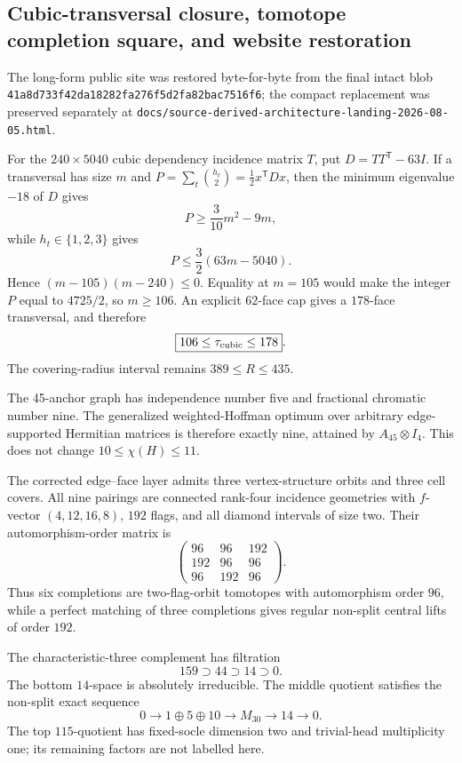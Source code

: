 \subsection{Cubic-transversal closure, tomotope completion square, and website restoration}
\label{sec:bt3729-3742-five-front-website-restore}

The long-form public site was restored byte-for-byte from the final intact blob
\texttt{41a8d733f42da18282fa276f5d2fa82bac7516f6}; the compact replacement was
preserved separately at
\texttt{docs/source-derived-architecture-landing-2026-08-05.html}.

For the $240\times5040$ cubic dependency incidence matrix $T$, put
$D=TT^{\mathsf T}-63I$.  If a transversal has size $m$ and
$P=\sum_t\binom{h_t}{2}=\frac12x^{\mathsf T}Dx$, then the minimum eigenvalue
$-18$ of $D$ gives
\[
 P\geq \frac3{10}m^2-9m,
\]
while $h_t\in\{1,2,3\}$ gives
\[
 P\leq \frac32(63m-5040).
\]
Hence $(m-105)(m-240)\leq0$.  Equality at $m=105$ would make the integer
$P$ equal to $4725/2$, so $m\geq106$.  An explicit $62$-face cap gives a
$178$-face transversal, and therefore
\[
 \boxed{106\leq\tau_{\rm cubic}\leq178}.
\]
The covering-radius interval remains $389\leq R\leq435$.

The 45-anchor graph has independence number five and fractional chromatic number
nine.  The generalized weighted-Hoffman optimum over arbitrary edge-supported
Hermitian matrices is therefore exactly nine, attained by
$A_{45}\otimes I_4$.  This does not change $10\leq\chi(H)\leq11$.

The corrected edge--face layer admits three vertex-structure orbits and three
cell covers.  All nine pairings are connected rank-four incidence geometries
with $f$-vector $(4,12,16,8)$, $192$ flags, and all diamond intervals of size
two.  Their automorphism-order matrix is
\[
\begin{pmatrix}
96&96&192\\
192&96&96\\
96&192&96
\end{pmatrix}.
\]
Thus six completions are two-flag-orbit tomotopes with automorphism order $96$,
while a perfect matching of three completions gives regular non-split central
lifts of order $192$.

The characteristic-three complement has filtration
\[
159\supset44\supset14\supset0.
\]
The bottom $14$-space is absolutely irreducible.  The middle quotient satisfies
the non-split exact sequence
\[
0\longrightarrow 1\oplus5\oplus10
\longrightarrow M_{30}
\longrightarrow14
\longrightarrow0.
\]
The top $115$-quotient has fixed-socle dimension two and trivial-head
multiplicity one; its remaining factors are not labelled here.

